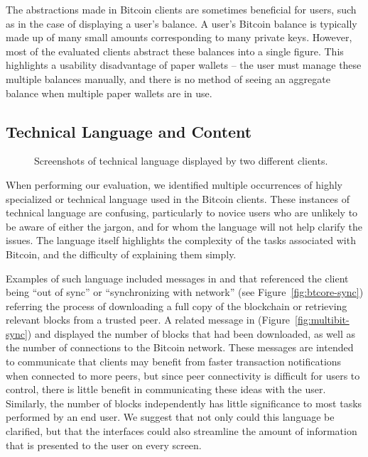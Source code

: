 The abstractions made in Bitcoin clients are sometimes beneficial for users, such as in the case of displaying a user's balance. A user's Bitcoin balance is typically made up of many small amounts corresponding to many private keys. However, most of the evaluated clients abstract these balances into a single figure. This highlights a usability disadvantage of paper wallets -- the user must manage these multiple balances manually, and there is no method of seeing an aggregate balance when multiple paper wallets are in use.

\subsection{Technical Language and Content}
\begin{figure}[htb]
        \centering
                
        
        \caption{Screenshots of technical language displayed by two different clients. }\label{fig:techlang}
\end{figure}
%
When performing our evaluation, we identified multiple occurrences of highly specialized or technical language used in the Bitcoin clients. These instances of technical language are confusing, particularly to novice users who are unlikely to be aware of either the jargon, and for whom the language will not help clarify the issues. The language itself highlights the complexity of the tasks associated with Bitcoin, and the difficulty of explaining them simply.

Examples of such language included messages in \multibit and  \bitcoinclient that referenced the client being ``out of sync'' or ``synchronizing with network'' (see Figure~\ref{fig:btcore-sync}) referring the process of downloading a full copy of the blockchain or retrieving relevant blocks from a trusted peer. A related message in \multibit (Figure~\ref{fig:multibit-sync}) and \armory displayed the number of blocks that had been downloaded, as well as the number of connections to the Bitcoin network. These messages are intended to communicate that clients may benefit from faster transaction notifications when connected to more peers, but since peer connectivity is difficult for users to control, there is little benefit in communicating these ideas with the user. Similarly, the number of blocks independently has little significance to most tasks performed by an end user. We suggest that not only could this language be clarified, but that the interfaces could also streamline the amount of information that is presented to the user on every screen.


